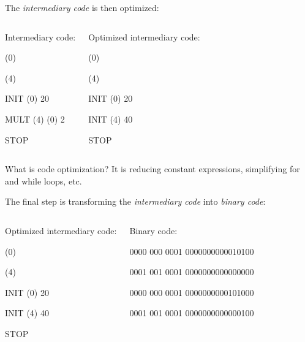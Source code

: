 \documentclass{beamer}[10pt, usepdftitle=false, handout]
\begin{document}
	\begin{frame}
	
	The \textit{intermediary code} is then optimized:
	\vspace*{1em}

	\begin{columns}[c]
	\begin{tiny}
		
	Intermediary code:
	\vspace*{.5em}
	
	(0)
	
	(4)
	
	INIT (0) 20
	
	MULT (4) (0) 2
	
	STOP 
	
	\end{tiny}
	\column{.5\textwidth}
	\begin{tiny}
	Optimized intermediary code:
	\vspace*{.5em}
	
	(0)
	
	(4)
	
	INIT (0) 20
	
	INIT (4) 40
	
	STOP 
	
	\end{tiny}
	\end{columns}

	\vspace*{0.5em}

	\begin{block}{What is code optimization?}
	It is reducing constant expressions, simplifying for and while loops, etc.
	\end{block}
	
	\vspace*{1em}

	The final step is transforming the \textit{intermediary code} into \textit{binary code}:

\vspace*{1em}
\begin{columns}[c]
	\column{.4\textwidth}
	\begin{tiny}
	Optimized intermediary code:
	\vspace*{.5em}
	
	(0)
	
	(4)
	
	INIT (0) 20
	
	INIT (4) 40
	
	STOP
	
	\end{tiny}
	\column{.6\textwidth}
	\begin{tiny}
	\vspace*{0.5em}
 	Binary code:
 	
 	0000 000 0001  0000000000010100
 	
 	0001 001 0001  0000000000000000
 	
 	0000 000 0001  0000000000101000
 	
 	0001 001 0001  0000000000000100
 	
	\end{tiny}
	\end{columns}

	\end{frame}
\end{document}
